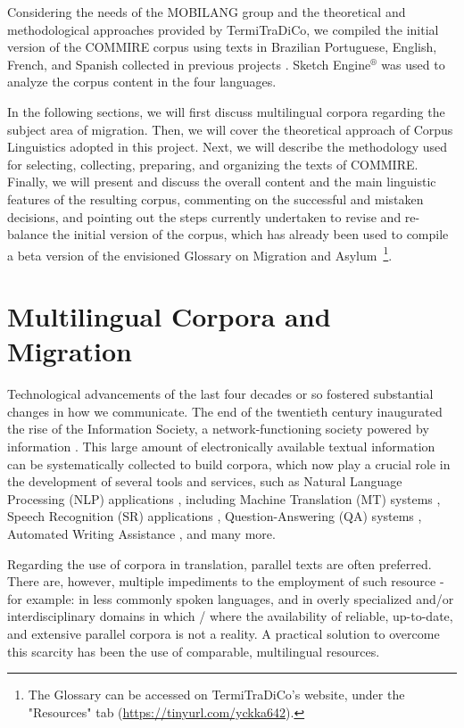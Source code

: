 \documentclass[english]{textolivre}
\begin{document}
Considering the needs of the MOBILANG group and the theoretical and methodological approaches provided by TermiTraDiCo, we compiled the initial version of the COMMIRE corpus using texts in Brazilian Portuguese, English, French, and Spanish collected in previous projects \cite{furtado_compilacao_2019-1,furtado_compilacao_2019}. Sketch Engine$^®$ \cite{kilgarriff_sketch_2004,kilgarriff_sketch_2021} was used to analyze the corpus content in the four languages.

In the following sections, we will first discuss multilingual corpora regarding the subject area of migration. Then, we will cover the theoretical approach of Corpus Linguistics adopted in this project. Next, we will describe the methodology used for selecting, collecting, preparing, and organizing the texts of COMMIRE. Finally, we will present and discuss the overall content and the main linguistic features of the resulting corpus, commenting on the successful and mistaken decisions, and pointing out the steps currently undertaken to revise and re-balance the initial version of the corpus, which has already been used to compile a beta version of the envisioned Glossary on Migration and Asylum~\cite{furtado_glossario_2019}\footnote{The Glossary can be accessed on TermiTraDiCo's website, under the "Resources" tab (\url{https://tinyurl.com/yckka642}).}.

\section{Multilingual Corpora and Migration}\label{sec-normas}

Technological advancements of the last four decades or so fostered substantial changes in how we communicate. The end of the twentieth century inaugurated the rise of the Information Society, a network-functioning society powered by information \cite{castells_galaxia_2003}. This large amount of electronically available textual information can be systematically collected to build corpora, which now play a crucial role in the development of several tools and services, such as Natural Language Processing (NLP) applications \cite{jurafsky_speech_2009}, including Machine Translation (MT) systems \cite{poibeau_machine_2017}, Speech Recognition (SR) applications \cite{mitkov_speech_2014}, Question-Answering (QA) systems \cite{mitkov_question_2014}, Automated Writing Assistance \cite{mitkov_automated_2014}, and many more.

Regarding the use of corpora in translation, parallel texts are often preferred. There are, however, multiple impediments to the employment of such resource - for example: in less commonly spoken languages, and in overly specialized and/or interdisciplinary domains in which / where the availability of reliable, up-to-date, and extensive parallel corpora is not a reality. A practical solution to overcome this scarcity has been the use of comparable, multilingual resources.
\end{document}
